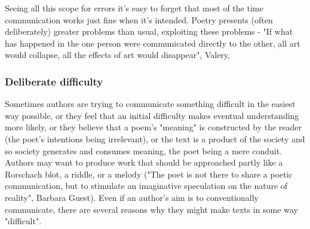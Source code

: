 \documentclass[11pt]{article}
\begin{document}
Seeing all this scope for errors it's easy to forget that most of the
time communication works just fine when it's intended. Poetry presents (often deliberately)
greater problems than usual, exploiting these problems - "If what has happened in the one person were                                                                                       
communicated directly to the other, all art would collapse, all the effects                           
of art would disappear", Valery, 

\subsubsection*{Deliberate difficulty} 

Sometimes authors are trying to communicate something difficult in the easiest way possible, or they feel that an initial difficulty makes eventual understanding more likely, or they believe that a poem's "meaning" is constructed by the reader (the poet's intentions being irrelevant), or the text is a product of the society and so society generates and consumes meaning, the poet being a mere conduit. Authors may want to produce work that should be approached partly like a Rorschach blot, a riddle, or a melody ("The poet is not there to share a poetic communication, but to stimulate an imaginative speculation on the nature of reality", Barbara Guest). Even if an author's aim is to conventionally communicate, there are several reasons why they might make texts in some way "difficult". 
\end{document}
